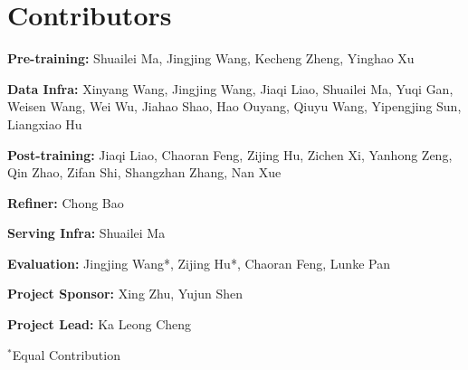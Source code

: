 \section*{Contributors}

\noindent\textbf{Pre-training:} Shuailei Ma, Jingjing Wang, Kecheng Zheng, Yinghao Xu

\noindent\textbf{Data Infra:} Xinyang Wang, Jingjing Wang, Jiaqi Liao, Shuailei Ma, Yuqi Gan, Weisen Wang, Wei Wu, Jiahao Shao, Hao Ouyang, Qiuyu Wang, Yipengjing Sun, Liangxiao Hu

\noindent\textbf{Post-training:} Jiaqi Liao, Chaoran Feng, Zijing Hu, Zichen Xi, Yanhong Zeng, Qin Zhao, Zifan Shi, Shangzhan Zhang, Nan Xue

\noindent\textbf{Refiner:} Chong Bao

\noindent\textbf{Serving Infra:} Shuailei Ma

\noindent\textbf{Evaluation:} Jingjing Wang*, Zijing Hu*, Chaoran Feng, Lunke Pan

\noindent\textbf{Project Sponsor:} Xing Zhu, Yujun Shen

\noindent\textbf{Project Lead:} Ka Leong Cheng

\noindent $^*$Equal Contribution
